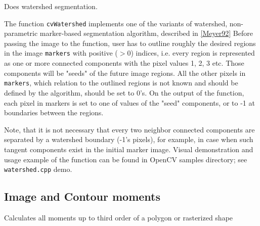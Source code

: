 Does watershed segmentation.


\begin{description}
\end{description}

The function \texttt{cvWatershed} implements one of the variants of watershed, non-parametric marker-based segmentation algorithm, described in \href{#Meyer92}{[Meyer92]} Before passing the image to the function, user has to outline roughly the desired regions in the image \texttt{markers} with positive ($>$0) indices, i.e. every region is represented as one or more connected components with the pixel values 1, 2, 3 etc. Those components will be "seeds" of the future image regions. All the other pixels in \texttt{markers}, which relation to the outlined regions is not known and should be defined by the algorithm, should be set to 0's. On the output of the function, each pixel in markers is set to one of values of the "seed" components, or to -1 at boundaries between the regions.

Note, that it is not necessary that every two neighbor connected components are separated by a watershed boundary (-1's pixels), for example, in case when such tangent components exist in the initial marker image. Visual demonstration and usage example of the function can be found in OpenCV samples directory; see \texttt{watershed.cpp} demo.

\subsection{Image and Contour moments}

\label{Moments}

Calculates all moments up to third order of a polygon or rasterized shape


\begin{description}
\end{description}

